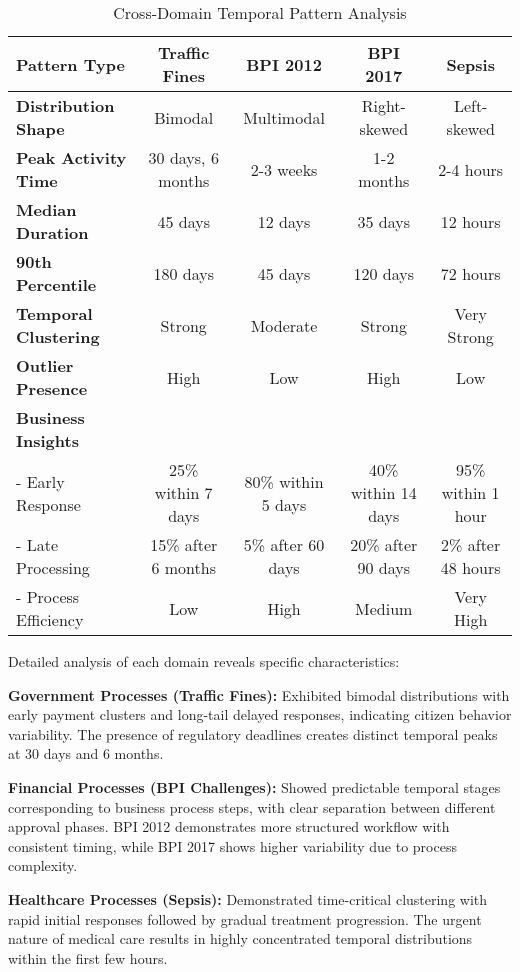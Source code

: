 \documentclass[11pt,a4paper]{article}
\begin{document}
\begin{table}[H]
\centering
\caption{Cross-Domain Temporal Pattern Analysis}
\label{tab:patterns}
\begin{tabular}{@{}lcccc@{}}
\toprule
\textbf{Pattern Type} & \textbf{Traffic Fines} & \textbf{BPI 2012} & \textbf{BPI 2017} & \textbf{Sepsis} \\
\midrule
\textbf{Distribution Shape} & Bimodal & Multimodal & Right-skewed & Left-skewed \\
\textbf{Peak Activity Time} & 30 days, 6 months & 2-3 weeks & 1-2 months & 2-4 hours \\
\textbf{Median Duration} & 45 days & 12 days & 35 days & 12 hours \\
\textbf{90th Percentile} & 180 days & 45 days & 120 days & 72 hours \\
\textbf{Temporal Clustering} & Strong & Moderate & Strong & Very Strong \\
\textbf{Outlier Presence} & High & Low & High & Low \\
\midrule
\textbf{Business Insights} & & & & \\
- Early Response & 25\% within 7 days & 80\% within 5 days & 40\% within 14 days & 95\% within 1 hour \\
- Late Processing & 15\% after 6 months & 5\% after 60 days & 20\% after 90 days & 2\% after 48 hours \\
- Process Efficiency & Low & High & Medium & Very High \\
\bottomrule
\end{tabular}
\end{table}

Detailed analysis of each domain reveals specific characteristics:

\textbf{Government Processes (Traffic Fines):} Exhibited bimodal distributions with early payment clusters and long-tail delayed responses, indicating citizen behavior variability. The presence of regulatory deadlines creates distinct temporal peaks at 30 days and 6 months.

\textbf{Financial Processes (BPI Challenges):} Showed predictable temporal stages corresponding to business process steps, with clear separation between different approval phases. BPI 2012 demonstrates more structured workflow with consistent timing, while BPI 2017 shows higher variability due to process complexity.

\textbf{Healthcare Processes (Sepsis):} Demonstrated time-critical clustering with rapid initial responses followed by gradual treatment progression. The urgent nature of medical care results in highly concentrated temporal distributions within the first few hours.
\end{document}
